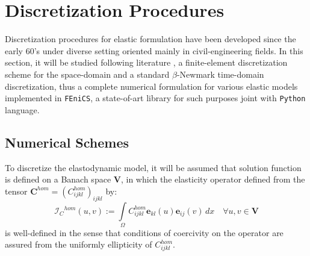 \chapter{Discretization Procedures}

Discretization procedures for elastic formulation have been developed since the early $60$'s under diverse setting oriented mainly in civil-engineering fields. In this section, it will be studied following literature  \cite{ern2004theory}, \cite{raviart1983introduction} a finite-element discretization scheme for the space-domain and a standard $\beta$-Newmark time-domain discretization, thus a complete numerical formulation for various elastic models implemented in \texttt{FEniCS}, a state-of-art library for such purposes joint with \texttt{Python} language.

\section{Numerical Schemes}
To discretize the elastodynamic model, it will be assumed that solution function is defined on a Banach space $\mathbf{V}$, in which the elasticity operator defined from the tensor $\mathbf{C}^{hom} = (C^{hom}_{ijkl})_{ijkl}$ by:
\begin{equation*}
    \mathcal{I}_C{^{hom}} (u,v) := \int \limits_{\Omega} C^{hom}_{ijkl}\mathbf{e}_{kl}(u) \mathbf{e}_{ij}(v) \, dx \quad \forall u,v \in \mathbf{V}
\end{equation*}
is well-defined in the sense that conditions of coercivity on the operator are assured from the uniformly ellipticity of $C^{hom}_{ijkl}$.

